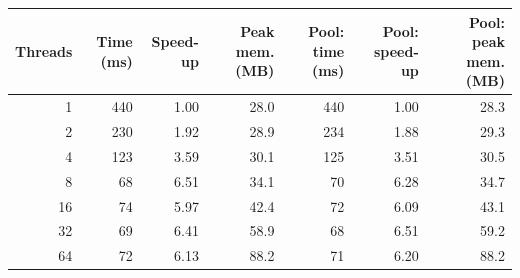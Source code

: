 \begin{tabular}{rrrrrrr}
\toprule
Threads & Time (ms) & Speed-up & Peak mem. (MB) & Pool: time (ms) & Pool: speed-up & Pool: peak mem. (MB) \\
\midrule
1 & 440 & 1.00 & 28.0 & 440 & 1.00 & 28.3 \\
2 & 230 & 1.92 & 28.9 & 234 & 1.88 & 29.3 \\
4 & 123 & 3.59 & 30.1 & 125 & 3.51 & 30.5 \\
8 & 68 & 6.51 & 34.1 & 70 & 6.28 & 34.7 \\
16 & 74 & 5.97 & 42.4 & 72 & 6.09 & 43.1 \\
32 & 69 & 6.41 & 58.9 & 68 & 6.51 & 59.2 \\
64 & 72 & 6.13 & 88.2 & 71 & 6.20 & 88.2 \\
\bottomrule
\end{tabular}
